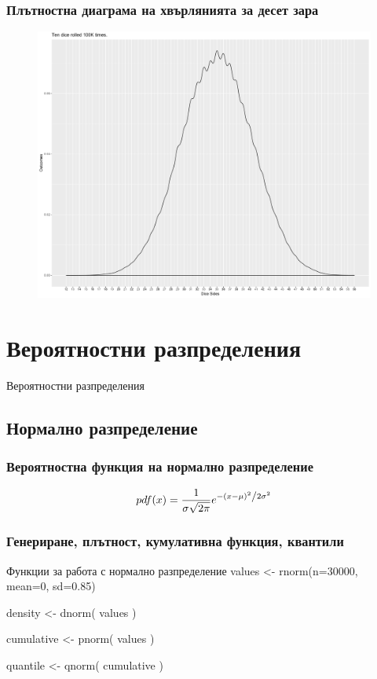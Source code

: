 \documentclass{beamer}
\begin{document}
\begin{frame}
\frametitle{Плътностна диаграма на хвърлянията за десет зара}
\begin{figure}[]\includegraphics[width=\textwidth,height=0.75\textheight]{pic0050}\end{figure}
\end{frame}

\section{Вероятностни разпределения}

\begin{frame}
\center \huge{Вероятностни разпределения}
\end{frame}

\subsection{Нормално разпределение}

\begin{frame}
\frametitle{Вероятностна функция на нормално разпределение}
\begin{equation}
pdf(x) = \frac{1}{{\sigma \sqrt {2\pi } }}e^{{{ - \left( {x - \mu } \right)^2 } \mathord{\left/ {\vphantom {{ - \left( {x - \mu } \right)^2 } {2\sigma ^2 }}} \right. \kern-\nulldelimiterspace} {2\sigma ^2 }}}
\end{equation}
\end{frame}

\begin{frame}
\frametitle{Генериране, плътност, кумулативна функция, квантили}
\begin{block}{Функции за работа с нормално разпределение}
values <- rnorm(n=30000, mean=0, sd=0.85)

density <- dnorm( values ) 

cumulative <- pnorm( values ) 

quantile <- qnorm( cumulative )
\end{block}
\end{frame}
\end{document}
